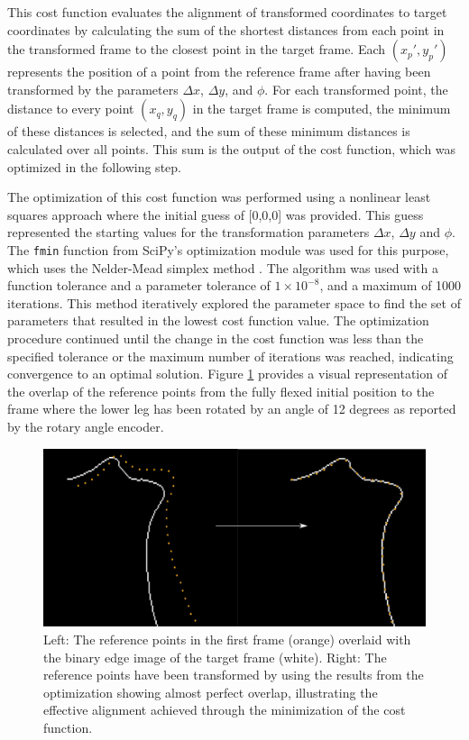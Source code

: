 \documentclass{micro-econ-thesis}
\begin{document}
This cost function evaluates the alignment of transformed coordinates to target coordinates by calculating the sum of the shortest distances from each point in the transformed frame to the closest point in the target frame. Each $(x_p', y_p')$ represents the position of a point from the reference frame after having been transformed by the parameters $\Delta x$, $\Delta y$, and $\phi$. For each transformed point, the distance to every point $(x_q, y_q)$ in the target frame is computed, the minimum of these distances is selected, and the sum of these minimum distances is calculated over all points. This sum is the output of the cost function, which was optimized in the following step. 

The optimization of this cost function was performed using a nonlinear least squares approach where the initial guess of [0,0,0] was provided. This guess represented the starting values for the transformation parameters $\Delta x$, $\Delta y$ and $\phi$. The \texttt{fmin} function from SciPy’s optimization module was used for this purpose, which uses the Nelder-Mead simplex method \parencite{nelder_simplex_1965}. The algorithm was used with a function tolerance and a parameter tolerance of $1 \times 10^{-8}$, and a maximum of 1000 iterations. This method iteratively explored the parameter space to find the set of parameters that resulted in the lowest cost function value. The optimization procedure continued until the change in the cost function was less than the specified tolerance or the maximum number of iterations was reached, indicating convergence to an optimal solution. Figure \ref{fig:edge_tracking} provides a visual representation of the overlap of the reference points from the fully flexed initial position to the frame where the lower leg has been rotated by an angle of 12 degrees as reported by the rotary angle encoder. 
\begin{figure}[H]
	\centering
	\includegraphics[width=0.7\linewidth]{image137}
	\caption{Left: The reference points in the first frame (orange) overlaid with the binary edge image of the target frame (white). Right: The reference points have been transformed by using the results from the optimization showing almost perfect overlap, illustrating the effective alignment achieved through the minimization of the cost function.}
	\label{fig:edge_tracking}
\end{figure}
\end{document}
